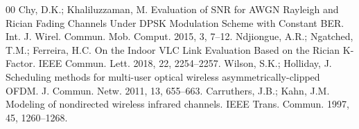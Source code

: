 \documentclass[conference]{IEEEtran}
\begin{document}
\begin{thebibliography}{00}
 Chy, D.K.; Khaliluzzaman, M. Evaluation of SNR for AWGN Rayleigh and Rician Fading Channels Under DPSK Modulation Scheme with Constant BER. Int. J. Wirel. Commun. Mob. Comput. 2015, 3, 7--12.
 Ndjiongue, A.R.; Ngatched, T.M.; Ferreira, H.C. On the Indoor VLC Link Evaluation Based on the Rician K-Factor. IEEE Commun. Lett. 2018, 22, 2254--2257.
 Wilson, S.K.; Holliday, J. Scheduling methods for multi-user optical wireless asymmetrically-clipped OFDM. J. Commun. Netw. 2011, 13, 655--663.
 Carruthers, J.B.; Kahn, J.M. Modeling of nondirected wireless infrared channels. IEEE Trans. Commun. 1997, 45, 1260--1268.

\end{thebibliography}
\end{document}
